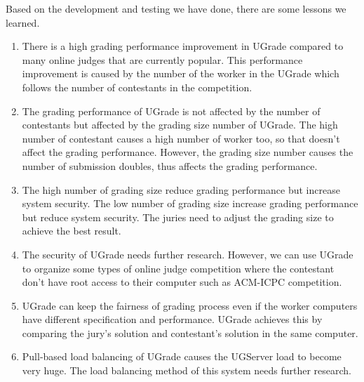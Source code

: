 \documentclass[conference]{IEEEtran}
\begin{document}
Based on the development and testing we have done, there are some lessons we learned.
\begin{enumerate}
    \item There is a high grading performance improvement in UGrade compared to many online judges that are currently popular. This performance improvement is caused by the number of the worker in the UGrade which follows the number of contestants in the competition.
    \item The grading performance of UGrade is not affected by the number of contestants but affected by the grading size number of UGrade. The high number of contestant causes a high number of worker too, so that doesn't affect the grading performance. However, the grading size number causes the number of submission doubles, thus affects the grading performance.
    \item The high number of grading size reduce grading performance but increase system security. The low number of grading size increase grading performance but reduce system security. The juries need to adjust the grading size to achieve the best result.
    \item The security of UGrade needs further research. However, we can use UGrade to organize some types of online judge competition where the contestant don't have root access to their computer such as ACM-ICPC competition.
    \item UGrade can keep the fairness of grading process even if the worker computers have different specification and performance. UGrade achieves this by comparing the jury's solution and contestant's solution in the same computer.
    \item Pull-based load balancing of UGrade causes the UGServer load to become very huge. The load balancing method of this system needs further research.
\end{enumerate}
\end{document}
